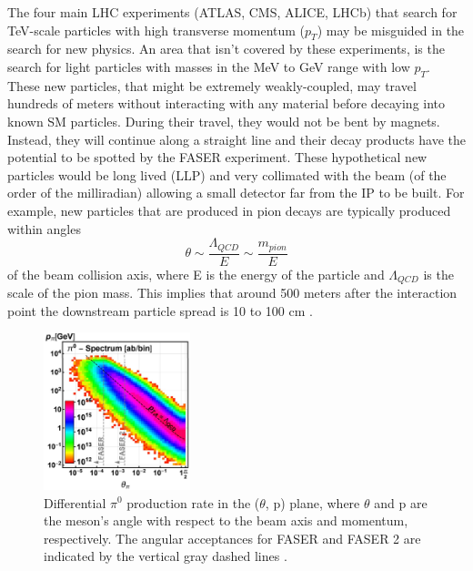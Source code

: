 The four main LHC experiments (ATLAS, CMS, ALICE, LHCb) that search for TeV-scale particles with high transverse momentum ($p_{T}$) may be misguided in the search for new physics. An area that isn't covered by these experiments, is the search for light particles with masses in the MeV to GeV range with low $p_{T}$. These new particles, that might be extremely weakly-coupled, may travel hundreds of meters without interacting with any material before decaying into known SM particles. During their travel, they would not be bent by magnets. Instead, they will continue along a straight line and their decay products have the potential to be spotted by the FASER experiment. These hypothetical new particles would be long lived (LLP) and very collimated with the beam (of the order of the milliradian) allowing a small detector far from the IP to be built. For example, new particles that are produced in pion decays are typically produced within angles \[ \theta\sim\frac{\Lambda_{QCD}}{E}\sim\frac{m_{pion}}{E} \] of the beam collision axis, where E is the energy of the particle and $\Lambda_{QCD}$ is the scale of the pion mass. This implies that around 500 meters after the interaction point the downstream particle spread is 10 to 100 cm \cite{faser_collaboration_letter_2018}. 

\begin{figure}
  \centering
    \includegraphics[width=0.38\textwidth]{Introduction/Figs/Raster/momentumVSangle.jpg} 
    \caption[Momentum vs angle]{Differential $\pi^{0}$ production rate in the ($\theta$, p) plane, where $\theta$ and p are the meson’s angle with respect to the beam axis and momentum, respectively. The angular acceptances for FASER and FASER 2 are indicated by the vertical gray dashed lines \cite{faser_collaboration_fasers_2019}.}
    \label{fig:momentumVSangle}
\end{figure}

